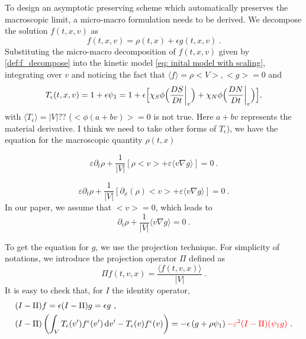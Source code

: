 \documentclass[11pt,twoside]{article}
\theoremstyle{nonumberplain}
\newcommand*\diff{\mathop{}\!\mathrm{d}}
\begin{document}
To design an asymptotic preserving scheme which automatically preserves the macroscopic limit, a micro-macro formulation needs to be derived. 
We decompose the solution $f(t,x,v)$ as 
\begin{equation}\label{def:f_decompose}
    f(t,x,v) = \rho(t,x) + \epsilon g(t,x,v)\ .
\end{equation}
Substituting the micro-macro decomposition of $f(t, x, v)$ given by \eqref{def:f_decompose} into the  kinetic model \eqref{eq: inital model with scaling}, integrating over $v$ and noticing the fact that {\color{red} $\langle f\rangle = \rho <V>, <g> = 0$ and 
$$
T_\epsilon(t,x,{v})= 1+\epsilon \psi_1 = 1+\epsilon\Bigl[\chi_S\phi\Bigl(\frac{DS}{Dt}\bigg\rvert_{v}\Bigr)+ \chi_N\phi\Bigl(\frac{DN}{Dt}\bigg\rvert_{v}\Bigr)\Bigr],$$
with $\langle T_\epsilon \rangle=|V|??$ ($<\phi(a+bv)>=0$ is not true. Here $a+bv$ represents the material derivative. I think we need to take other forms of $T_\epsilon$)}, we have the equation for the macroscopic quantity $\rho(t, x)$
{\color{red}\begin{equation*}
    \varepsilon\partial_t \rho  +  \frac{1}{|V|}\left[\rho <v> + \varepsilon \langle v \nabla  g\rangle\right]  =  0\ .
\end{equation*}

{\color{green}\begin{equation*}
    \varepsilon\partial_t \rho  +  \frac{1}{|V|}\left[\partial_x(\rho) <v> + \varepsilon \langle v \nabla  g\rangle\right]  =  0\ .
\end{equation*}}
In our paper, we assume that $<v> = 0$, which leads to 
\begin{equation*}
    \partial_t \rho  +  \frac{1}{|V|} \langle v \nabla  g\rangle  =  0\ .
\end{equation*}
}
To get the equation for $g$, we use the projection technique. 
For simplicity of notations, we introduce the projection operator {\color{red}$\Pi$ defined as 
\begin{equation*}
    \Pi f(t,{v},{x}) = \frac{\langle f(t,{v},{x})\rangle}{|V|} \ .
\end{equation*}}
It is easy to check that, {for $I$ the identity operator,} 
\begin{align*}
    & (I - \Pi) f = \epsilon(I - \Pi) g = \epsilon g\ ,\\
    & (I - \Pi) \left(\int_VT_\epsilon(v')f^\epsilon(v')\diff v'-T_\epsilon(v)f^\epsilon(v)\right) = -\epsilon\left(g+\rho \psi_1 \right)  {\color{red} - \varepsilon^2 (I-\Pi) (\psi_1 g)}\ .
\end{align*}
\end{document}
